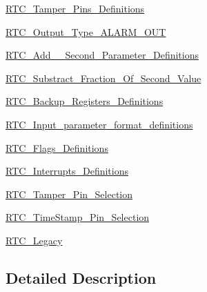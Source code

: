 \begin{DoxyCompactItemize}
\hyperlink{group___r_t_c___tamper___pins___definitions}{R\-T\-C\-\_\-\-Tamper\-\_\-\-Pins\-\_\-\-Definitions}
\item 
\hyperlink{group___r_t_c___output___type___a_l_a_r_m___o_u_t}{R\-T\-C\-\_\-\-Output\-\_\-\-Type\-\_\-\-A\-L\-A\-R\-M\-\_\-\-O\-U\-T}
\item 
\hyperlink{group___r_t_c___add__1___second___parameter___definitions}{R\-T\-C\-\_\-\-Add\-\_\-\_\-\-Second\-\_\-\-Parameter\-\_\-\-Definitions}
\item 
\hyperlink{group___r_t_c___substract___fraction___of___second___value}{R\-T\-C\-\_\-\-Substract\-\_\-\-Fraction\-\_\-\-Of\-\_\-\-Second\-\_\-\-Value}
\item 
\hyperlink{group___r_t_c___backup___registers___definitions}{R\-T\-C\-\_\-\-Backup\-\_\-\-Registers\-\_\-\-Definitions}
\item 
\hyperlink{group___r_t_c___input__parameter__format__definitions}{R\-T\-C\-\_\-\-Input\-\_\-parameter\-\_\-format\-\_\-definitions}
\item 
\hyperlink{group___r_t_c___flags___definitions}{R\-T\-C\-\_\-\-Flags\-\_\-\-Definitions}
\item 
\hyperlink{group___r_t_c___interrupts___definitions}{R\-T\-C\-\_\-\-Interrupts\-\_\-\-Definitions}
\item 
\hyperlink{group___r_t_c___tamper___pin___selection}{R\-T\-C\-\_\-\-Tamper\-\_\-\-Pin\-\_\-\-Selection}
\item 
\hyperlink{group___r_t_c___time_stamp___pin___selection}{R\-T\-C\-\_\-\-Time\-Stamp\-\_\-\-Pin\-\_\-\-Selection}
\item 
\hyperlink{group___r_t_c___legacy}{R\-T\-C\-\_\-\-Legacy}
\end{DoxyCompactItemize}


\subsection{Detailed Description}
